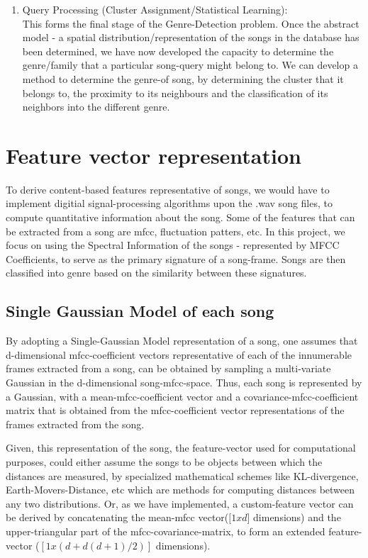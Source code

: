 \documentclass[10pt]{article}
\begin{document}
\begin{enumerate}
\item Query Processing (Cluster Assignment/Statistical Learning):\\
This forms the final stage of the Genre-Detection problem. Once the abstract model - a spatial distribution/representation of the songs in the database has been determined, we have now developed the capacity to determine the genre/family that a particular song-query might belong to. We can develop a method to determine the genre-of song, by determining the cluster that it belongs to, the proximity to its neighbours and the classification of its neighbors into the different genre. 


\end{enumerate}

\section{Feature vector representation}

To derive content-based features representative of songs, we would have to implement digitial signal-processing algorithms upon the .wav song files, to compute quantitative information about the song. Some of the features that can be extracted from a song are mfcc, fluctuation patters, etc. In this project, we focus on using the Spectral Information of the songs - represented by MFCC Coefficients, to serve as the primary signature of a song-frame. Songs are then classified into genre based on the similarity between these signatures. 

\subsection{Single Gaussian Model of each song}

By adopting a Single-Gaussian Model representation of a song, one assumes that d-dimensional mfcc-coefficient vectors representative of each of the innumerable frames extracted from a song, can be obtained by sampling a multi-variate Gaussian in the d-dimensional song-mfcc-space. Thus, each song is represented by a Gaussian, with a mean-mfcc-coefficient vector and a covariance-mfcc-coefficient matrix that is obtained from the mfcc-coefficient vector representations of the frames extracted from the song. 

Given, this representation of the song, the feature-vector used for computational purposes, could either assume the songs to be objects between which the distances are measured, by specialized mathematical schemes like KL-divergence, Earth-Movers-Distance, etc which are methods for computing distances between any two distributions. Or, as we have implemented, a custom-feature vector can be derived by concatenating the mean-mfcc vector($[1xd$] dimensions) and the upper-triangular part of the mfcc-covariance-matrix, to form an extended feature-vector ($[1x (d + d(d+1)/2)]$ dimensions).
\end{document}

